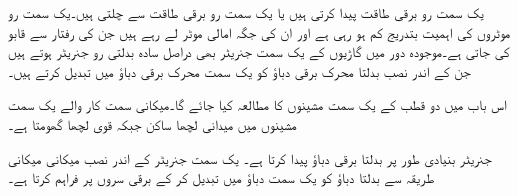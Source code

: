   یک سمت  رو برقی طاقت پیدا کرتی ہیں یا یک سمت  رو برقی طاقت سے چلتی ہیں۔یک سمت  رو موٹروں کی اہمیت بتدریج کم ہو رہی ہے اور ان کی جگہ امالی موٹر لے رہے ہیں جن کی رفتار   سے قابو کی جاتی ہے۔موجودہ دور میں گاڑیوں کے یک سمت  جنریٹر بھی دراصل سادہ بدلتی رو جنریٹر ہوتے ہیں جن کے اندر نصب   بدلتا محرک برقی دباؤ کو یک سمت  محرک برقی دباؤ میں تبدیل کرتے ہیں۔

اس باب میں دو قطب کے یک سمت  مشینوں کا مطالعہ کیا جائے گا۔میکانی سمت کار  والے یک سمت  مشینوں میں میدانی لچھا ساکن  جبکہ قوی لچھا گھومتا ہے۔

جنریٹر بنیادی طور پر بدلتا برقی دباؤ پیدا کرتا ہے۔ یک سمت  جنریٹر کے اندر نصب  میکانی  میکانی طریقہ سے بدلتا دباؤ کو یک سمت  دباؤ میں تبدیل کر کے برقی سروں پر فراہم کرتا ہے۔

